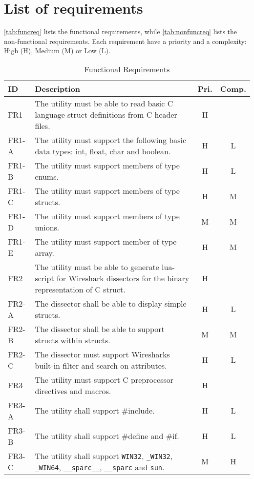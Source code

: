 \section{List of requirements}
\label{sec:reqslist}
\autoref{tab:funcreq} lists the functional requirements, while
\autoref{tab:nonfuncreq} lists the non-functional requirements. Each
requirement have a priority and a complexity: High (H), Medium (M) or
Low (L).

\begin{table}[ht] \footnotesize \center
\caption{Functional Requirements\label{tab:funcreq}}
\begin{tabularx}{\textwidth}{l X c c}
	\toprule
	ID & Description & Pri. & Comp. \\
	\midrule
	FR1 & The utility must be able to read basic C language
		struct definitions from C header files.
		& H & \\
	FR1-A & The utility must support the following basic data types:
		int, float, char and boolean.
		& H & L \\
	FR1-B & The utility must support members of type enums.
		& H & L \\
	FR1-C & The utility must support members of type structs.
		& H & M \\
	FR1-D & The utility must support members of type unions.
		& M & M \\
	FR1-E & The utility must support member of type array.
		& H & M \\
	\midrule
	FR2 & The utility must be able to generate lua-script for Wireshark
		dissectors for the binary representation of C struct.
		& H & \\
	FR2-A & The dissector shall be able to display simple structs.
		& H & L \\
	FR2-B & The dissector shall be able to support structs within
		structs.
		& M & M \\
	FR2-C & The dissector must support Wiresharks built-in filter and
		search on attributes.
		& H & L \\
	\midrule
	FR3 & The utility must support C preprocessor directives and macros.
		& H & \\
	FR3-A & The utility shall support \#include.
		& H & L \\
	FR3-B & The utility shall support \#define and \#if.
		& H & L \\
	FR3-C & The utility shall support \verb+WIN32+, \verb+_WIN32+,
		\verb+_WIN64+, \verb+__sparc__+, \verb+__sparc+ and \verb+sun+.
		& M & H \\

\end{tabularx}
\end{table}
